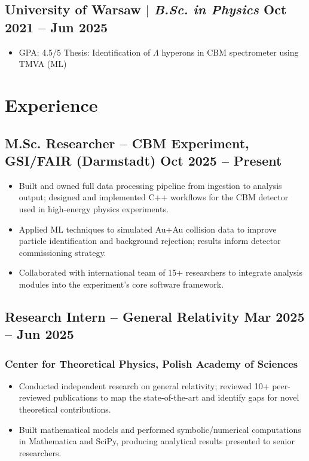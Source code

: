 \documentclass[11pt]{article}
\begin{document}
\subsection{University of Warsaw $|$ {\normalfont\textit{B.Sc. in Physics}} \hfill Oct 2021 -- Jun 2025}
\begin{itemize}
    \item GPA: 4.5/5 \quad Thesis: Identification of $\Lambda$ hyperons in CBM spectrometer using TMVA (ML)
\end{itemize}

\section{Experience}
\subsection{M.Sc. Researcher -- CBM Experiment, GSI/FAIR (Darmstadt) \hfill Oct 2025 -- Present}
\begin{itemize}
    \item Built and owned full data processing pipeline from ingestion to analysis output; designed and implemented C++ workflows for the CBM detector used in high-energy physics experiments.
    \item Applied ML techniques to simulated Au+Au collision data to improve particle identification and background rejection; results inform detector commissioning strategy.
    \item Collaborated with international team of 15+ researchers to integrate analysis modules into the experiment's core software framework.
\end{itemize}

\subsection{Research Intern -- General Relativity \hfill Mar 2025 -- Jun 2025}
\subsubsection{Center for Theoretical Physics, Polish Academy of Sciences}
\begin{itemize}
    \item Conducted independent research on general relativity; reviewed 10+ peer-reviewed publications to map the state-of-the-art and identify gaps for novel theoretical contributions.
    \item Built mathematical models and performed symbolic/numerical computations in Mathematica and SciPy, producing analytical results presented to senior researchers.
\end{itemize}
\end{document}
